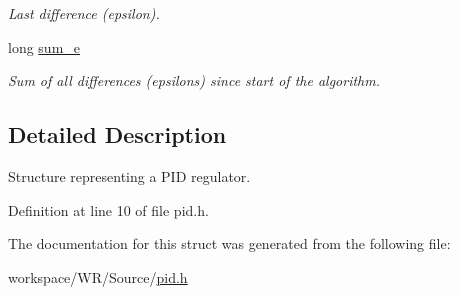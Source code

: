 \begin{DoxyCompactItemize}
\begin{DoxyCompactList}\small\item\em Last difference (epsilon). \item\end{DoxyCompactList}\item 
\hypertarget{structpid__str_ab5da6edeb8d607bf45f9be8330079120}{
long \hyperlink{structpid__str_ab5da6edeb8d607bf45f9be8330079120}{sum\_\-e}}
\label{structpid__str_ab5da6edeb8d607bf45f9be8330079120}

\begin{DoxyCompactList}\small\item\em Sum of all differences (epsilons) since start of the algorithm. \item\end{DoxyCompactList}\end{DoxyCompactItemize}


\subsection{Detailed Description}
Structure representing a PID regulator. 

Definition at line 10 of file pid.h.



The documentation for this struct was generated from the following file:\begin{DoxyCompactItemize}
\item 
workspace/WR/Source/\hyperlink{pid_8h}{pid.h}\end{DoxyCompactItemize}
